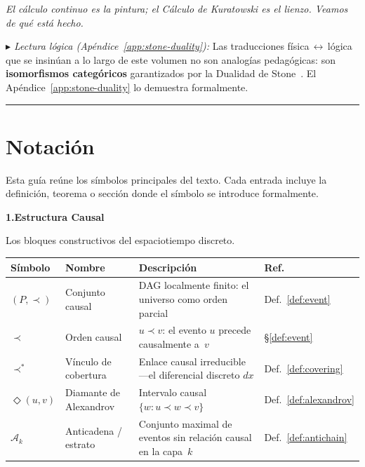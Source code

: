 \documentclass[11pt, a4paper, openany]{book}
\newcommand{\covers}{\prec^{\!*}}
\newcommand{\diam}[2]{\Diamond(#1,#2)}
\newcommand{\stoneref}[1]{%
  \smallskip\noindent
  {\small\color{structure!70}\textit{$\blacktriangleright$ Lectura
  l\'ogica (Ap\'endice~\ref{app:stone-duality}):} #1}%
  \smallskip}
\begin{document}
\begin{center}
\itshape
El c\'alculo continuo es la pintura; el C\'alculo de Kuratowski es el
lienzo. Veamos de qu\'e est\'a hecho.
\end{center}

\stoneref{Las traducciones f\'isica$\,\leftrightarrow\,$l\'ogica
que se insin\'uan a lo largo de este volumen no son analog\'ias
pedag\'ogicas: son \textbf{isomorfismos categ\'oricos} garantizados
por la Dualidad de Stone~\cite{stone1936}. El
Ap\'endice~\ref{app:stone-duality} lo demuestra formalmente.}

\bigskip
\begin{center}
\rule{0.4\textwidth}{0.5pt}
\end{center}

\chapter*{Notaci\'on}

\noindent
Esta gu\'ia re\'une los s\'imbolos principales del texto.
Cada entrada incluye la definici\'on, teorema o secci\'on donde
el s\'imbolo se introduce formalmente.

\bigskip
\small

{\bfseries\color{structure} 1.\quad Estructura Causal}

\smallskip\noindent
Los bloques constructivos del espaciotiempo discreto.

\smallskip
\begin{tabular}{@{}l@{\;\;}l@{\;\;}p{5.2cm}@{\;\;}l@{}}
\toprule
\textbf{S\'imbolo} & \textbf{Nombre} & \textbf{Descripci\'on} & \textbf{Ref.} \\
\midrule
$(P,\prec)$ & Conjunto causal &
  DAG localmente finito: el universo como orden parcial &
  Def.~\ref{def:event} \\[3pt]
$\prec$ & Orden causal &
  $u \prec v$: el evento $u$ precede causalmente a~$v$ &
  \S\ref{def:event} \\[3pt]
$\covers$ & V\'inculo de cobertura &
  Enlace causal irreducible---el diferencial discreto $dx$ &
  Def.~\ref{def:covering} \\[3pt]
$\diam{u}{v}$ & Diamante de Alexandrov &
  Intervalo causal $\{w : u \prec w \prec v\}$ &
  Def.~\ref{def:alexandrov} \\[3pt]
$\mathcal{A}_k$ & Anticadena / estrato &
  Conjunto maximal de eventos sin relaci\'on causal en la capa~$k$ &
  Def.~\ref{def:antichain} \\
\bottomrule
\end{tabular}
\end{document}
